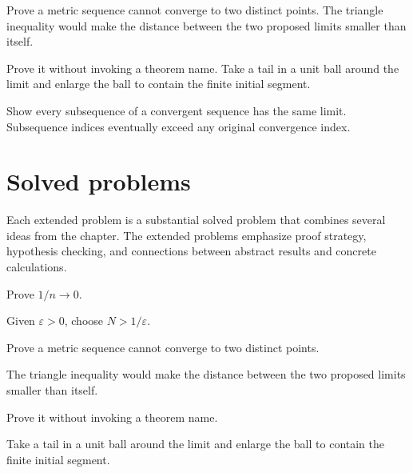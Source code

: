 \begin{example}\label{ex:ii03-worked-02}
Prove a metric sequence cannot converge to two distinct points. The triangle inequality would make the distance between the two proposed limits smaller than itself.
\end{example}

\begin{example}\label{ex:ii03-worked-03}
Prove it without invoking a theorem name. Take a tail in a unit ball around the limit and enlarge the ball to contain the finite initial segment.
\end{example}

\begin{example}\label{ex:ii03-worked-04}
Show every subsequence of a convergent sequence has the same limit. Subsequence indices eventually exceed any original convergence index.
\end{example}

\section{Solved problems}
Each extended problem is a substantial solved problem that combines several ideas from the chapter. The extended problems emphasize proof strategy, hypothesis checking, and connections between abstract results and concrete calculations.

\begin{problem}\label{prob:ii03-problem-01}
Prove $1/n\to0$.
\end{problem}
\begin{solution}
Given $\varepsilon>0$, choose $N>1/\varepsilon$.
\end{solution}

\begin{problem}\label{prob:ii03-problem-02}
Prove a metric sequence cannot converge to two distinct points.
\end{problem}
\begin{solution}
The triangle inequality would make the distance between the two proposed limits smaller than itself.
\end{solution}

\begin{problem}\label{prob:ii03-problem-03}
Prove it without invoking a theorem name.
\end{problem}
\begin{solution}
Take a tail in a unit ball around the limit and enlarge the ball to contain the finite initial segment.
\end{solution}


